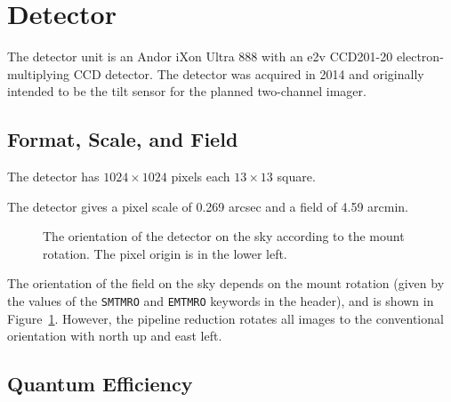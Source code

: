 \section{Detector}

The detector unit is an Andor iXon Ultra 888 with an e2v CCD201-20 electron-multiplying CCD detector. The detector was acquired in 2014 and originally intended to be the tilt sensor for the planned two-channel imager.

\subsection{Format, Scale, and Field}

The detector has $1024\times1024$ pixels each $13\times13$ {\micron} square. 

The detector gives a pixel scale of 0.269 arcsec and a field of 4.59 arcmin. 

\begin{figure}
\begin{center}
\end{center}
\caption{The orientation of the detector on the sky according to the mount rotation. The pixel origin is in the lower left.}
\label{figure:detector-orientation}
\end{figure}

The orientation of the field on the sky depends on the mount rotation (given by the values of the \verb|SMTMRO| and \verb|EMTMRO| keywords in the header), and is shown in Figure~\ref{figure:detector-orientation}. However, the pipeline reduction rotates all images to the conventional orientation with north up and east left.

\subsection{Quantum Efficiency}

